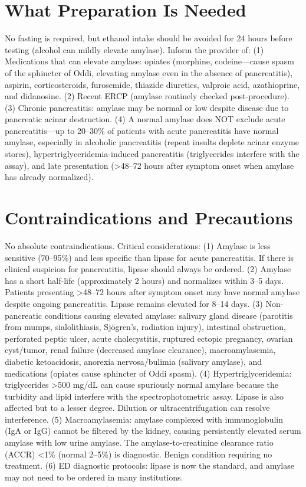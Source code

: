 \section*{What Preparation Is Needed}
No fasting is required, but ethanol intake should be avoided for 24 hours before testing (alcohol can mildly elevate amylase). Inform the provider of: (1) Medications that can elevate amylase: opiates (morphine, codeine---cause spasm of the sphincter of Oddi, elevating amylase even in the absence of pancreatitis), aspirin, corticosteroids, furosemide, thiazide diuretics, valproic acid, azathioprine, and didanosine. (2) Recent ERCP (amylase routinely checked post-procedure). (3) Chronic pancreatitis: amylase may be normal or low despite disease due to pancreatic acinar destruction. (4) A normal amylase does NOT exclude acute pancreatitis---up to 20--30\% of patients with acute pancreatitis have normal amylase, especially in alcoholic pancreatitis (repeat insults deplete acinar enzyme stores), hypertriglyceridemia-induced pancreatitis (triglycerides interfere with the assay), and late presentation (>48--72 hours after symptom onset when amylase has already normalized).

\section*{Contraindications and Precautions}
No absolute contraindications. Critical considerations: (1) Amylase is less sensitive (70--95\%) and less specific than lipase for acute pancreatitis. If there is clinical suspicion for pancreatitis, lipase should always be ordered. (2) Amylase has a short half-life (approximately 2 hours) and normalizes within 3--5 days. Patients presenting >48--72 hours after symptom onset may have normal amylase despite ongoing pancreatitis. Lipase remains elevated for 8--14 days. (3) Non-pancreatic conditions causing elevated amylase: salivary gland disease (parotitis from mumps, sialolithiasis, Sj\"{o}gren's, radiation injury), intestinal obstruction, perforated peptic ulcer, acute cholecystitis, ruptured ectopic pregnancy, ovarian cyst/tumor, renal failure (decreased amylase clearance), macroamylasemia, diabetic ketoacidosis, anorexia nervosa/bulimia (salivary amylase), and medications (opiates cause sphincter of Oddi spasm). (4) Hypertriglyceridemia: triglycerides >500 mg/dL can cause spuriously normal amylase because the turbidity and lipid interfere with the spectrophotometric assay. Lipase is also affected but to a lesser degree. Dilution or ultracentrifugation can resolve interference. (5) Macroamylasemia: amylase complexed with immunoglobulin (IgA or IgG) cannot be filtered by the kidney, causing persistently elevated serum amylase with low urine amylase. The amylase-to-creatinine clearance ratio (ACCR) <1\% (normal 2--5\%) is diagnostic. Benign condition requiring no treatment. (6) ED diagnostic protocols: lipase is now the standard, and amylase may not need to be ordered in many institutions.

